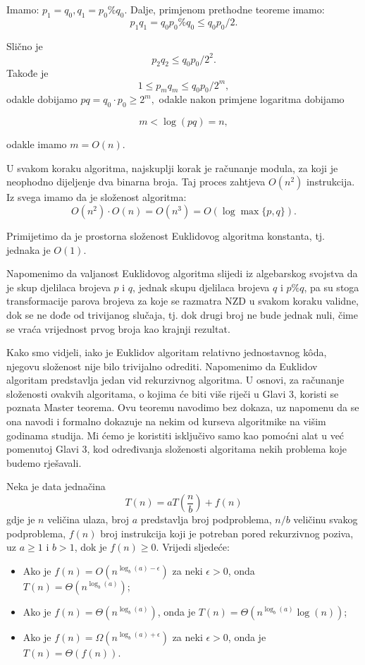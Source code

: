 \begin{example}
	Imamo: $p_1 = q_0, q_1 = p_0 \%q_0. $ Dalje, primjenom prethodne teoreme imamo: 
	$$ p_1 q_1 = q_0 p_0 \% q_0  \leq q_0 p_0 /2.$$
	
	Slično je 
		$$ p_2 q_2 \leq q_0 p_0 /2^2 .$$
Takođe je 
		$$ 1  \leq p_m q_m \leq q_0 p_0 /2^m, $$
odakle dobijamo $pq =  q_0 \cdot p_0 \geq 2^m, $ odakle nakon primjene logaritma dobijamo 

$$   m < \log (pq ) = n,$$

odakle imamo $m = O(n)$.

U svakom koraku algoritma, najskuplji korak je računanje modula, za koji je neophodno dijeljenje dva binarna broja. Taj proces zahtjeva $O(n^2)$ instrukcija. 
Iz svega imamo da je složenost algoritma:
$$ O(n^2)\cdot O(n) = O(n^3)= O(\log \max\{p,q\}).$$

Primijetimo da je prostorna složenost Euklidovog algoritma konstanta, tj. jednaka je $O(1)$. 
\end{example}


Napomenimo da valjanost Euklidovog algoritma slijedi iz algebarskog svojstva da je skup djelilaca brojeva $p$ i $q$, jednak skupu djelilaca brojeva $q$ i $p\%q$, pa su stoga transformacije parova brojeva za koje se razmatra NZD u svakom koraku validne, dok se ne dođe od trivijanog slučaja, tj. dok drugi broj ne bude jednak nuli, čime se vraća vrijednost prvog broja kao krajnji rezultat. 

Kako smo vidjeli, iako je Euklidov algoritam relativno jednostavnog k\^oda, njegovu složenost nije bilo trivijalno odrediti. Napomenimo da Euklidov algoritam predstavlja jedan vid rekurzivnog algoritma.  %
 U osnovi, za računanje složenosti ovakvih algoritama, o kojima će biti više riječi u Glavi 3, koristi se poznata Master teorema. Ovu teoremu navodimo bez dokaza, uz napomenu da se ona navodi i formalno dokazuje na nekim od kurseva algoritmike na višim godinama studija. Mi ćemo je koristiti isključivo samo kao pomoćni alat u već pomenutoj Glavi 3, kod određivanja složenosti algoritama nekih problema koje budemo rješavali. 

\begin{theorem}
	Neka je data jednačina 
$$T(n) = aT\left(\frac{n}{b}\right) + f(n)$$
gdje je  $n$  veličina ulaza, broj $a$ predstavlja  broj podproblema,
$n/b$ veličinu svakog podproblema, $f(n)$ broj instrukcija koji je potreban pored rekurzivnog poziva, uz $a\geq 1$ i $b>1$, dok je $f(n)\geq 0$. Vrijedi sljedeće:
\begin{itemize}
	\item Ako je $f(n) = O(n^{\log_b (a) - \epsilon})$ za neki $\epsilon>0$, onda $ T(n) = \Theta (n^{\log_b (a)})$;
	\item Ako je $f(n) = \Theta (n^{\log_b (a)})$, onda je $T(n) = \Theta (n^{\log_b (a)} \log(n))$;
	\item Ako je $f(n) = \Omega (n^{\log_b (a) + \epsilon})$  za neki $\epsilon>0$, onda je $T(n) = \Theta (f(n))$. 
	
\end{itemize}
\end{theorem} 

